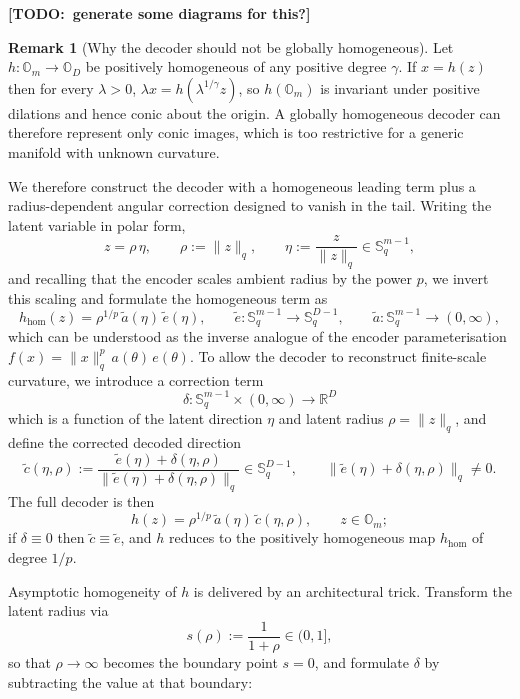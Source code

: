 \documentclass{article}
\theoremstyle{definition}
\newtheorem{remark}[theorem]{Remark}
\newcommand{\todo}[1]{{\color{red}\textbf{[TODO:~#1]}}}
\begin{document}
\todo{generate some diagrams for this?}

\begin{remark}[Why the decoder should not be globally homogeneous]
\label{rmk:globally-homogeneous-decoder}
Let \(h:\mathbb{O}_m\to\mathbb{O}_D\) be positively homogeneous of any positive degree \(\gamma\). If \(x=h(z)\) then for every \(\lambda>0\), \(\lambda x = h(\lambda^{1/\gamma} z)\), so \(h(\mathbb{O}_m)\) is invariant under positive dilations and hence conic about the origin. A globally homogeneous decoder can therefore represent only conic images, which is too restrictive for a generic manifold with unknown curvature.
\end{remark}

We therefore construct the decoder with a homogeneous leading term plus a radius-dependent angular correction designed to vanish in the tail. Writing the latent variable in polar form,
\[
z=\rho\,\eta,
\qquad
\rho:=\|z\|_{q},
\qquad
\eta:=\frac{z}{\|z\|_{q}}\in\mathbb{S}^{m-1}_{q},
\]
and recalling that the encoder scales ambient radius by the power \(p\), we invert this scaling and formulate the homogeneous term as
\[
h_{\mathrm{hom}}(z)
=
\rho^{1/p}\,\tilde a(\eta)\,\tilde e(\eta),
\qquad
\tilde e:\mathbb{S}^{m-1}_{q}\to \mathbb{S}^{D-1}_{q},
\qquad
\tilde a:\mathbb{S}^{m-1}_{q}\to (0,\infty),
\]
which can be understood as the inverse analogue of the encoder parameterisation \(f(x)=\|x\|_{q}^{p}\,a(\theta)\,e(\theta)\). To allow the decoder to reconstruct finite-scale curvature, we introduce a correction term
\[
\delta:\mathbb{S}^{m-1}_{q}\times(0,\infty)\to \mathbb{R}^D
\]
which is a function of the latent direction \(\eta\) and latent radius \(\rho=\|z\|_{q}\), and define the corrected decoded direction
\[
\tilde c(\eta,\rho)
:=
\frac{\tilde e(\eta)+\delta(\eta,\rho)}
{\bigl\|\tilde e(\eta)+\delta(\eta,\rho)\bigr\|_{q}}
\in \mathbb{S}^{D-1}_{q},
\qquad
\bigl\|\tilde e(\eta)+\delta(\eta,\rho)\bigr\|_{q}\neq 0.
\]
The full decoder is then
\[
h(z)
=
\rho^{1/p}\,\tilde a(\eta)\,\tilde c(\eta,\rho),
\qquad
z\in\mathbb{O}_{m};
\]
if \(\delta\equiv 0\) then \(\tilde c\equiv\tilde e\), and \(h\) reduces to the positively homogeneous map \(h_{\mathrm{hom}}\) of degree \(1/p\).

Asymptotic homogeneity of \(h\) is delivered by an architectural trick. Transform the latent radius via
\[
s(\rho):=\frac{1}{1+\rho}\in(0,1],
\]
so that \(\rho\to\infty\) becomes the boundary point \(s=0\), and formulate \(\delta\) by subtracting the value at that boundary:
\end{document}

